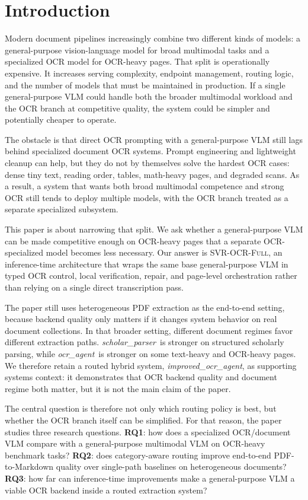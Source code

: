 \documentclass[conference]{IEEEtran}
\newcommand{\papername}[1]{\textit{#1}}
\newcommand{\scholar}{\papername{scholar\_parser}}
\newcommand{\ocragent}{\papername{ocr\_agent}}
\newcommand{\improvedocr}{\papername{improved\_ocr\_agent}}
\newcommand{\svrocr}{\textsc{SVR-OCR-Full}}
\begin{document}
\section{Introduction}

Modern document pipelines increasingly combine two different kinds of models: a general-purpose vision-language model for broad multimodal tasks and a specialized OCR model for OCR-heavy pages. That split is operationally expensive. It increases serving complexity, endpoint management, routing logic, and the number of models that must be maintained in production. If a single general-purpose VLM could handle both the broader multimodal workload and the OCR branch at competitive quality, the system could be simpler and potentially cheaper to operate.

The obstacle is that direct OCR prompting with a general-purpose VLM still lags behind specialized document OCR systems. Prompt engineering and lightweight cleanup can help, but they do not by themselves solve the hardest OCR cases: dense tiny text, reading order, tables, math-heavy pages, and degraded scans. As a result, a system that wants both broad multimodal competence and strong OCR still tends to deploy multiple models, with the OCR branch treated as a separate specialized subsystem.

This paper is about narrowing that split. We ask whether a general-purpose VLM can be made competitive enough on OCR-heavy pages that a separate OCR-specialized model becomes less necessary. Our answer is \svrocr, an inference-time architecture that wraps the same base general-purpose VLM in typed OCR control, local verification, repair, and page-level orchestration rather than relying on a single direct transcription pass.

The paper still uses heterogeneous PDF extraction as the end-to-end setting, because backend quality only matters if it changes system behavior on real document collections. In that broader setting, different document regimes favor different extraction paths. \scholar\ is stronger on structured scholarly parsing, while \ocragent\ is stronger on some text-heavy and OCR-heavy pages. We therefore retain a routed hybrid system, \improvedocr, as supporting systems context: it demonstrates that OCR backend quality and document regime both matter, but it is not the main claim of the paper.

The central question is therefore not only which routing policy is best, but whether the OCR branch itself can be simplified. For that reason, the paper studies three research questions. \textbf{RQ1}: how does a specialized OCR/document VLM compare with a general-purpose multimodal VLM on OCR-heavy benchmark tasks? \textbf{RQ2}: does category-aware routing improve end-to-end PDF-to-Markdown quality over single-path baselines on heterogeneous documents? \textbf{RQ3}: how far can inference-time improvements make a general-purpose VLM a viable OCR backend inside a routed extraction system?
\end{document}
